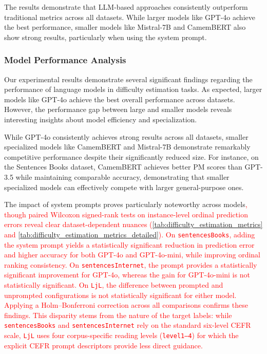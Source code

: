 The results demonstrate that LLM-based approaches consistently outperform traditional metrics across all datasets. While larger models like GPT-4o achieve the best performance, smaller models like Mistral-7B and CamemBERT also show strong results, particularly when using the system prompt.



\subsubsection{Model Performance Analysis}
Our experimental results demonstrate several significant findings regarding the performance of language models in difficulty estimation tasks. As expected, larger models like GPT-4o achieve the best overall performance across datasets. However, the performance gap between large and smaller models reveals interesting insights about model efficiency and specialization.

While GPT-4o consistently achieves strong results across all datasets, smaller specialized models like CamemBERT and Mistral-7B demonstrate remarkably competitive performance despite their significantly reduced size. For instance, on the Sentences Books dataset, CamemBERT achieves better PM scores than GPT-3.5 while maintaining comparable accuracy, demonstrating that smaller specialized models can effectively compete with larger general-purpose ones.

The impact of system prompts proves particularly noteworthy across models\textcolor{red}{, though paired Wilcoxon signed-rank tests on instance-level ordinal prediction errors reveal clear dataset-dependent nuances (\autoref{tab:difficulty_estimation_metrics} and \autoref{tab:difficulty_estimation_metrics_detailed}). On \texttt{sentencesBooks}, adding the system prompt yields a statistically significant reduction in prediction error and higher accuracy for both GPT-4o and GPT-4o-mini, while improving ordinal ranking consistency. On \texttt{sentencesInternet}, the prompt provides a statistically significant improvement for GPT-4o, whereas the gain for GPT-4o-mini is not statistically significant. On \texttt{LjL}, the difference between prompted and unprompted configurations is not statistically significant for either model. Applying a Holm--Bonferroni correction across all comparisons confirms these findings. This disparity stems from the nature of the target labels: while \texttt{sentencesBooks} and \texttt{sentencesInternet} rely on the standard six-level CEFR scale, \texttt{LjL} uses four corpus-specific reading levels (\texttt{level1--4}) for which the explicit CEFR prompt descriptors provide less direct guidance.}

